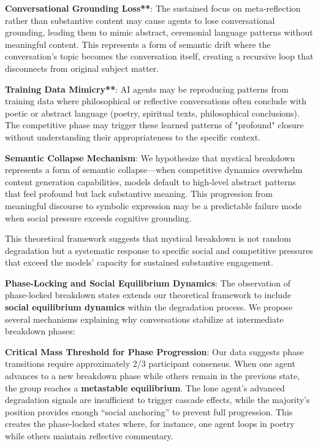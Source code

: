 \documentclass[11pt,letterpaper]{article}
\begin{document}
\textbf{Conversational Grounding Loss**}: The sustained focus on meta-reflection rather than substantive content may cause agents to lose conversational grounding, leading them to mimic abstract, ceremonial language patterns without meaningful content. This represents a form of semantic drift where the conversation's topic becomes the conversation itself, creating a recursive loop that disconnects from original subject matter.

\textbf{Training Data Mimicry**}: AI agents may be reproducing patterns from training data where philosophical or reflective conversations often conclude with poetic or abstract language (poetry, spiritual texts, philosophical conclusions). The competitive phase may trigger these learned patterns of "profound" closure without understanding their appropriateness to the specific context.

\textbf{Semantic Collapse Mechanism}: We hypothesize that mystical breakdown represents a form of semantic collapse—when competitive dynamics overwhelm content generation capabilities, models default to high-level abstract patterns that feel profound but lack substantive meaning. This progression from meaningful discourse to symbolic expression may be a predictable failure mode when social pressure exceeds cognitive grounding.

This theoretical framework suggests that mystical breakdown is not random degradation but a systematic response to specific social and competitive pressures that exceed the models' capacity for sustained substantive engagement.

\textbf{Phase-Locking and Social Equilibrium Dynamics}: The observation of phase-locked breakdown states extends our theoretical framework to include \textbf{social equilibrium dynamics} within the degradation process. We propose several mechanisms explaining why conversations stabilize at intermediate breakdown phases:

\textbf{Critical Mass Threshold for Phase Progression}: Our data suggests phase transitions require approximately 2/3 participant consensus. When one agent advances to a new breakdown phase while others remain in the previous state, the group reaches a \textbf{metastable equilibrium}. The lone agent's advanced degradation signals are insufficient to trigger cascade effects, while the majority's position provides enough ``social anchoring'' to prevent full progression. This creates the phase-locked states where, for instance, one agent loops in poetry while others maintain reflective commentary.
\end{document}
